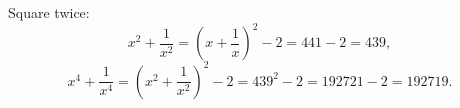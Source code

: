 Square twice:
\[
x^2+\dfrac{1}{x^2}=\left(x+\dfrac{1}{x}\right)^2-2=441-2=439,
\]
\[
x^4+\dfrac{1}{x^4}=\left(x^2+\dfrac{1}{x^2}\right)^2-2=439^2-2=192721-2=\boxed{192719}.
\]
